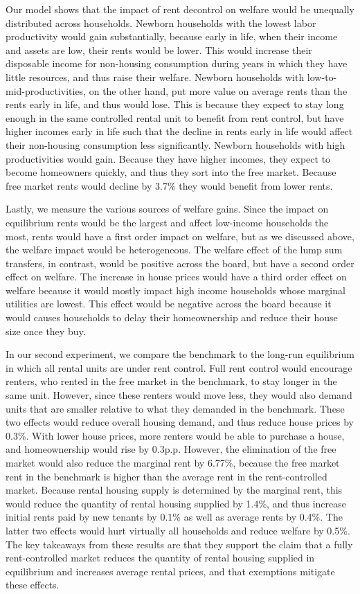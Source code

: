 \documentclass[parskip=full]{article}
\begin{document}
Our model shows that the impact of rent decontrol on welfare would be unequally distributed across households. Newborn households with the lowest labor productivity would gain substantially, because early in life, when their income and assets are low, their rents would be lower. This would increase their disposable income for non-housing consumption during years in which they have little resources, and thus raise their welfare. Newborn households with low-to-mid-productivities, on the other hand, put more value on average rents than the rents early in life, and thus would lose. This is because they expect to stay long enough in the same controlled rental unit to benefit from rent control, but have higher incomes early in life such that the decline in rents early in life would affect their non-housing consumption less significantly. Newborn households with high productivities would gain. Because they have higher incomes, they expect to become homeowners quickly, and thus they sort into the free market. Because free market rents would decline by 3.7\% they would benefit from lower rents. 

Lastly, we measure the various sources of welfare gains. Since the impact on equilibrium rents would be the largest and affect low-income households the most, rents would have a first order impact on welfare, but as we discussed above, the welfare impact would be heterogeneous. The welfare effect of the lump sum transfers, in contrast, would be positive across the board, but have a second order effect on welfare. The increase in house prices would have a third order effect on welfare because it would mostly impact high income households whose marginal utilities are lowest. This effect would be negative across the board because it would causes households to delay their homeownership and reduce their house size once they buy.

In our second experiment, we compare the benchmark to the long-run equilibrium in which all rental units are under rent control. Full rent control would encourage renters, who rented in the free market in the benchmark, to stay longer in the same unit. However, since these renters would move less, they would also demand units that are smaller relative to what they demanded in the benchmark. These two effects would reduce overall housing demand, and thus reduce house prices by 0.3\%. With lower house prices, more renters would be able to purchase a house, and homeownership would rise by 0.3p.p. However, the elimination of the free market would also reduce the marginal rent by 6.77\%, because the free market rent in the benchmark is higher than the average rent in the rent-controlled market. Because rental housing supply is determined by the marginal rent, this would reduce the quantity of rental housing supplied by 1.4\%, and thus increase initial rents paid by new tenants by 0.1\% as well as average rents by 0.4\%. The latter two effects would hurt virtually all households and reduce welfare by 0.5\%. The key takeaways from these results are that they support the claim that a fully rent-controlled market reduces the quantity of rental housing supplied in equilibrium and increases average rental prices, and that exemptions mitigate these effects. 
\end{document}
